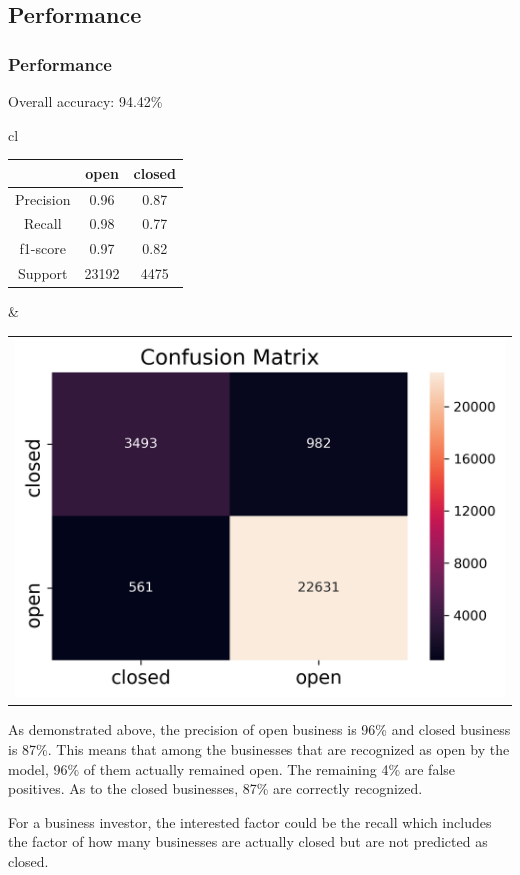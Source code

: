 \documentclass{beamer}
\begin{document}
\subsection{Performance}
\begin{frame}
\frametitle{Performance}
Overall accuracy: 94.42\%
\begin{tabular}{cl}  
	\begin{tabular}{|c|c|c|}
	\hline
	& open & closed \\
	\hline
	Precision	& 0.96   & 0.87 \\
	\hline
	Recall &0.98  &0.77 \\
	\hline
	f1-score &0.97  &0.82 \\
	\hline
	Support &23192  &4475 \\
	\hline
\end{tabular} 
&
\begin{tabular}{c} 
	\includegraphics[width=.45\textwidth]{confusion}
\end{tabular} 
\end{tabular} 

As demonstrated above, the precision of open business is 96\% and closed business is 87\%. This means that among the businesses that are recognized as open by the model, 96\% of them actually remained open. The remaining 4\% are false positives. As to the closed businesses, 87\% are correctly recognized.\vspace{1em}

For a business investor, the interested factor could be the recall which includes the factor of how many businesses are actually closed but are not predicted as closed. 

\end{frame}
\end{document}
